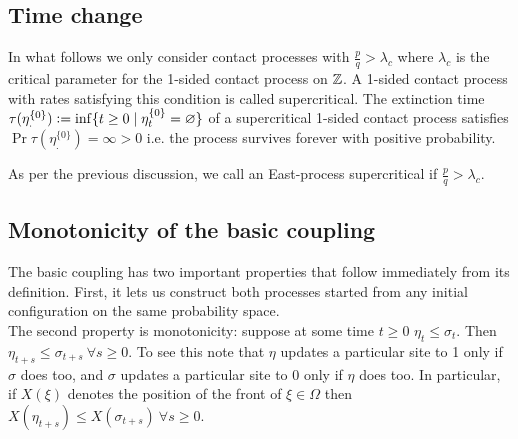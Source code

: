 \subsection{Time change}\label{ssec:time_change}

In what follows we only consider contact processes with $\frac{p}{q} > \lambda_c$ where $\lambda_c$ is the critical parameter for the 1-sided contact process on $\mathbb{Z}$. A 1-sided contact process with rates satisfying this condition is called supercritical. The extinction time $\tau(\eta^{\{0\}}_.) \vcentcolon= \inf\{t \geq 0 \mid \eta^{\{0\}}_t = \varnothing \}$ of a supercritical 1-sided contact process satisfies $\Pr{\tau(\eta^{\{0\}}_.) = \infty} > 0$ i.e. the process survives forever with positive probability. 

\begin{definition}
As per the previous discussion, we call an East-process supercritical if $\frac{p}{q} > \lambda_c$. 
\end{definition}

\subsection{Monotonicity of the basic coupling}
The basic coupling has two important properties that follow immediately from its definition. First, it lets us construct both processes started from any initial configuration on the same probability space. \\

The second property is monotonicity: suppose at some time $t \geq 0$ $\eta_t \leq \sigma_t$. Then $\eta_{t+s} \leq \sigma_{t+s}\ \forall s \geq 0$. To see this note that $\eta$ updates a particular site to 1 only if $\sigma$ does too, and $\sigma$ updates a particular site to 0 only if $\eta$ does too. In particular, if $X(\xi)$ denotes the position of the front of $\xi \in \Omega$ then $X(\eta_{t+s}) \leq X(\sigma_{t+s})\ \forall s \geq 0$. 
